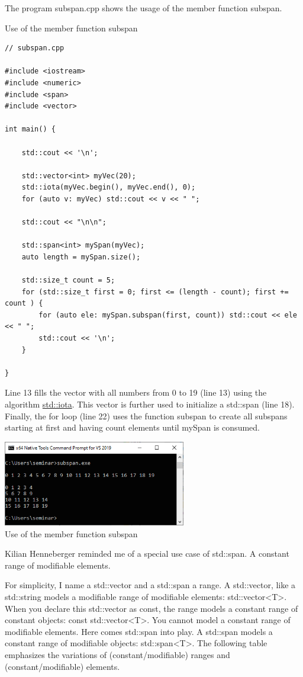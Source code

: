 The program subspan.cpp shows the usage of the member function subspan.

\noindent
Use of the member function subspan
\begin{lstlisting}[style=styleCXX]
// subspan.cpp

#include <iostream>
#include <numeric>
#include <span>
#include <vector>

int main() {

	std::cout << '\n';
	
	std::vector<int> myVec(20);
	std::iota(myVec.begin(), myVec.end(), 0);
	for (auto v: myVec) std::cout << v << " ";
	
	std::cout << "\n\n";
	
	std::span<int> mySpan(myVec);
	auto length = mySpan.size();
	
	std::size_t count = 5;
	for (std::size_t first = 0; first <= (length - count); first += count ) {
		for (auto ele: mySpan.subspan(first, count)) std::cout << ele << " ";
		std::cout << '\n';
	}

}
\end{lstlisting}

Line 13 fills the vector with all numbers from 0 to 19 (line 13) using the algorithm \href{https://en.cppreference.com/w/cpp/algorithm/iota}{std::iota}. This vector is further used to initialize a std::span (line 18). Finally, the for loop (line 22) uses the function subspan to create all subspans starting at first and having count elements until mySpan is consumed.

\begin{center}
\includegraphics[width=0.6\textwidth]{content/3/chapter5/images/8.png}\\
Use of the member function subspan
\end{center}

Kilian Henneberger reminded me of a special use case of std::span. A constant range of modifiable elements.


For simplicity, I name a std::vector and a std::span a range. A std::vector, like a std::string models a modifiable range of modifiable elements: std::vector<T>. When you declare this std::vector as const, the range models a constant range of constant objects: const std::vector<T>. You cannot model a constant range of modifiable elements. Here comes std::span into play. A std::span models a constant range of modifiable objects: std::span<T>. The following table emphasizes the variations of (constant/modifiable) ranges and (constant/modifiable) elements.


